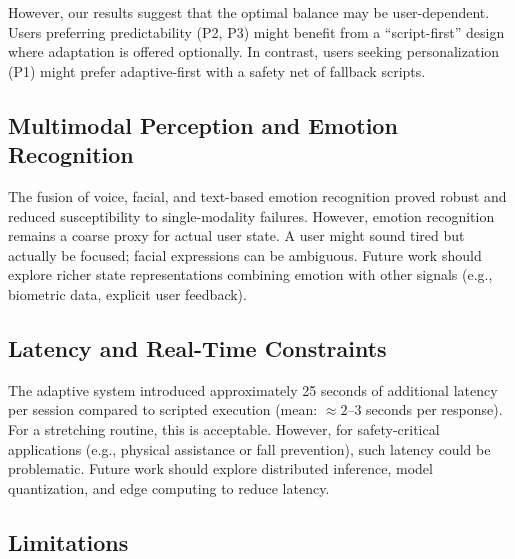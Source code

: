 However, our results suggest that the optimal balance may be user-dependent. Users preferring predictability (P2, P3) might benefit from a ``script-first'' design where adaptation is offered optionally. In contrast, users seeking personalization (P1) might prefer adaptive-first with a safety net of fallback scripts.

\subsection{Multimodal Perception and Emotion Recognition}

The fusion of voice, facial, and text-based emotion recognition proved robust and reduced susceptibility to single-modality failures. However, emotion recognition remains a coarse proxy for actual user state. A user might sound tired but actually be focused; facial expressions can be ambiguous. Future work should explore richer state representations combining emotion with other signals (e.g., biometric data, explicit user feedback).

\subsection{Latency and Real-Time Constraints}

The adaptive system introduced approximately 25 seconds of additional latency per session compared to scripted execution (mean: $\approx2$–$3$ seconds per response). For a stretching routine, this is acceptable. However, for safety-critical applications (e.g., physical assistance or fall prevention), such latency could be problematic. Future work should explore distributed inference, model quantization, and edge computing to reduce latency.

\subsection{Limitations}

